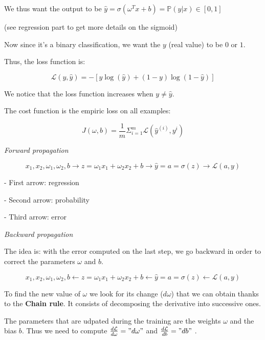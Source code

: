We thus want the output to be $\widehat{y}=\sigma(\omega^Tx + b)=\mathbb{P}(y|x) \in [0,1]$

(see regression part to get more details on the sigmoid)

\vspace{5mm}

Now since it's a binary classification, we want the $y$ (real value) to be $0$ or $1$.

Thus, the loss function is:

$$\mathcal{L}(y, \widehat{y})=-[y\log(\widehat{y})+(1-y)\log(1-\widehat{y})]$$

We notice that the loss function increases when $y \neq \widehat y$.

\vspace{5mm}

The cost function is the empiric loss on all examples:

$$J(\omega, b)=\frac{1}{m}\Sigma_{i=1}^m\mathcal{L}(\widehat{y}^{(i)}, y^i)$$

\vspace{5mm}

\textit{Forward propagation}

$$x_1,x_2, \omega_1,\omega_2,b \to z=\omega_1x_1 + \omega_2x_2 + b \to \widehat{y}=a=\sigma(z) \to \mathcal{L}(a,y)$$

- First arrow: regression

- Second arrow: probability

- Third arrow: error

\vspace{5mm}

\textit{Backward propagation}

\vspace{5mm}

The idea is: with the error computed on the last step, we go backward in order to correct the parameters $\omega$ and $b$.

$$x_1,x_2, \omega_1,\omega_2,b \leftarrow z=\omega_1x_1 + \omega_2x_2 + b \leftarrow \widehat{y}=a=\sigma(z) \leftarrow \mathcal{L}(a,y)$$

To find the new value of $\omega$ we look for its change ($d \omega$) that we can obtain thanks to the \textbf{Chain rule}. It consists of decomposing the derivative into successive ones.

The parameters that are udpated during the training are the weights $\omega$ and the bias $b$. Thus we need to compute $\frac{d\mathcal{L}}{d\omega}="d\omega"$ and $\frac{d\mathcal{L}}{db}="db"$ . \\

